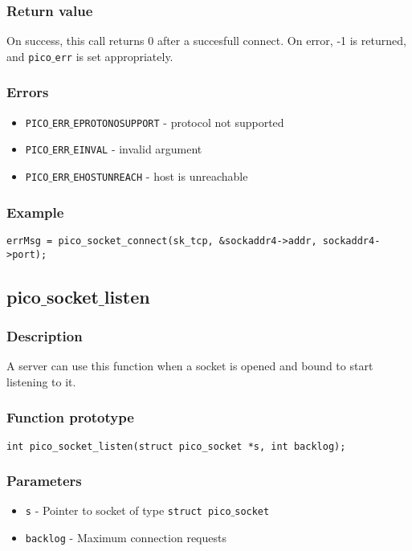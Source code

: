 \subsubsection*{Return value}
On success, this call returns 0 after a succesfull connect.
On error, -1 is returned, and \texttt{pico$\_$err} is set appropriately.

\subsubsection*{Errors}
\begin{itemize}[noitemsep]
\item \texttt{PICO$\_$ERR$\_$EPROTONOSUPPORT} - protocol not supported
\item \texttt{PICO$\_$ERR$\_$EINVAL} - invalid argument
\item \texttt{PICO$\_$ERR$\_$EHOSTUNREACH} - host is unreachable 
\end{itemize}

\subsubsection*{Example}
\begin{verbatim}
errMsg = pico_socket_connect(sk_tcp, &sockaddr4->addr, sockaddr4->port);
\end{verbatim}


\subsection{pico$\_$socket$\_$listen}

\subsubsection*{Description}
A server can use this function when a socket is opened and bound to start listening to it.

\subsubsection*{Function prototype}
\begin{verbatim}
int pico_socket_listen(struct pico_socket *s, int backlog);
\end{verbatim}


\subsubsection*{Parameters}
\begin{itemize}[noitemsep]
\item \texttt{s} - Pointer to socket of type \texttt{struct pico$\_$socket}
\item \texttt{backlog} - Maximum connection requests
\end{itemize}

